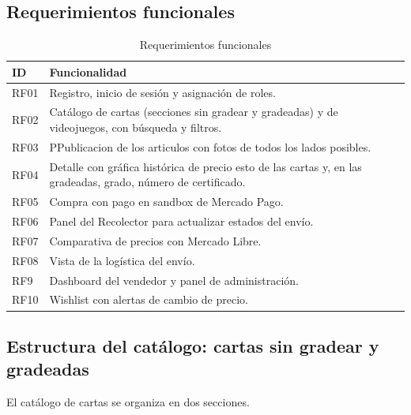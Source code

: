 \documentclass[letterpaper,11pt]{article}
\begin{document}
\newpage

\subsection{Requerimientos funcionales}

\begin{table}[H]
\centering
\begin{tabularx}{\textwidth}{|l|Y|}
\hline
\textbf{ID} & \textbf{Funcionalidad} \\ \hline
RF01 & Registro, inicio de sesión y asignación de roles. \\ \hline
RF02 & Catálogo de cartas (secciones sin gradear y gradeadas) y de videojuegos, con búsqueda y filtros. \\ \hline
RF03 & PPublicacion de los articulos con fotos de todos los lados posibles. \\ \hline
RF04 & Detalle con gráfica histórica de precio esto de las cartas y, en las gradeadas, grado, número de certificado. \\ \hline
RF05 & Compra con pago en sandbox de Mercado Pago. \\ \hline
RF06 & Panel del Recolector para actualizar estados del envío. \\ \hline
RF07 & Comparativa de precios con Mercado Libre. \\ \hline
RF08 & Vista de la logística del envío. \\ \hline
RF9  & Dashboard del vendedor y panel de administración. \\ \hline
RF10 & Wishlist con alertas de cambio de precio. \\ \hline
\end{tabularx}
\caption{Requerimientos funcionales}
\end{table}

\subsection{Estructura del catálogo: cartas sin gradear y gradeadas}

El catálogo de cartas se organiza en dos secciones. 
\end{document}
